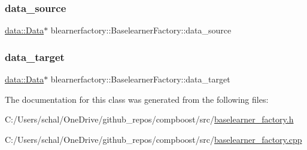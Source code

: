 \mbox{\label{classblearnerfactory_1_1_baselearner_factory_a6194191695958b4035d3ea0841c2320c}} 
\subsubsection{\texorpdfstring{data\+\_\+source}{data\_source}}
{\footnotesize\ttfamily \mbox{\hyperlink{classdata_1_1_data}{data\+::\+Data}}$\ast$ blearnerfactory\+::\+Baselearner\+Factory\+::data\+\_\+source\hspace{0.3cm}{\ttfamily [protected]}}

\mbox{\label{classblearnerfactory_1_1_baselearner_factory_af2cb5c226c90469c6a70b677214ecc2f}} 
\subsubsection{\texorpdfstring{data\+\_\+target}{data\_target}}
{\footnotesize\ttfamily \mbox{\hyperlink{classdata_1_1_data}{data\+::\+Data}}$\ast$ blearnerfactory\+::\+Baselearner\+Factory\+::data\+\_\+target\hspace{0.3cm}{\ttfamily [protected]}}



The documentation for this class was generated from the following files\+:\begin{DoxyCompactItemize}
\item 
C\+:/\+Users/schal/\+One\+Drive/github\+\_\+repos/compboost/src/\mbox{\hyperlink{baselearner__factory_8h}{baselearner\+\_\+factory.\+h}}\item 
C\+:/\+Users/schal/\+One\+Drive/github\+\_\+repos/compboost/src/\mbox{\hyperlink{baselearner__factory_8cpp}{baselearner\+\_\+factory.\+cpp}}\end{DoxyCompactItemize}

